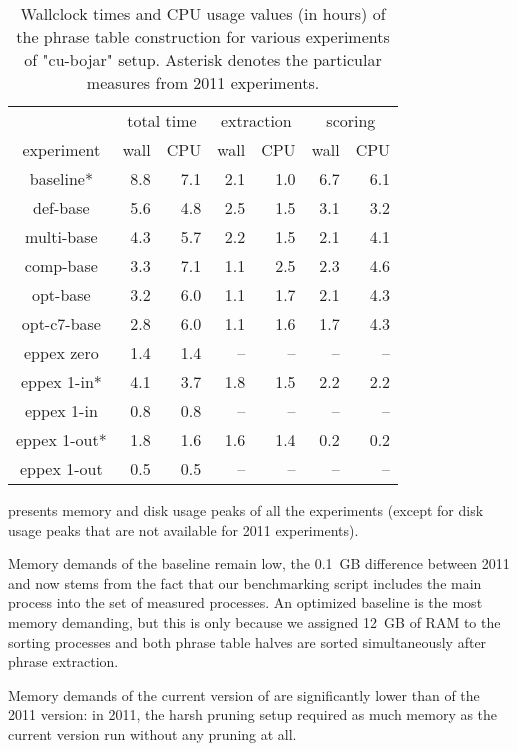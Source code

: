 \begin{table}[ht]
\centering
\begin{tabular}{ | c | r r | r r | r r | }
\hline
 & \multicolumn{2}{|c|}{total time} & \multicolumn{2}{|c|}{extraction} & \multicolumn{2}{|c|}{scoring} \\
experiment & wall & CPU & wall & CPU & wall & CPU \\
\hline
\hline
baseline*     & 8.8 & 7.1 & 2.1 & 1.0 & 6.7 & 6.1 \\
def-base      & 5.6 & 4.8 & 2.5 & 1.5 & 3.1 & 3.2 \\
multi-base    & 4.3 & 5.7 & 2.2 & 1.5 & 2.1 & 4.1 \\
comp-base     & 3.3 & 7.1 & 1.1 & 2.5 & 2.3 & 4.6 \\
opt-base      & 3.2 & 6.0 & 1.1 & 1.7 & 2.1 & 4.3 \\
opt-c7-base   & 2.8 & 6.0 & 1.1 & 1.6 & 1.7 & 4.3 \\
eppex zero    & 1.4 & 1.4 & -- & -- & -- & -- \\
\hline
eppex 1-in*   & 4.1 & 3.7 & 1.8 & 1.5 & 2.2 & 2.2 \\
eppex 1-in    & 0.8 & 0.8 & -- & -- & -- & -- \\
\hline
eppex 1-out*  & 1.8 & 1.6 & 1.6 & 1.4 & 0.2 & 0.2 \\
eppex 1-out   & 0.5 & 0.5 & -- & -- & -- & -- \\
\hline
\end{tabular}
\caption{\label{cu-bojar-time-benchmarks}
Wallclock times and CPU usage values (in hours) of the phrase table
construction for various experiments of "cu-bojar" setup.
Asterisk denotes the particular measures from 2011 experiments.}
\end{table}

 presents memory and disk usage peaks of all the experiments
(except for disk usage peaks that are not available for 2011 experiments).

Memory demands of the baseline remain low, the 0.1~GB difference between 2011 and now
stems from the fact that our benchmarking script includes the main process into the set of
measured processes.
An optimized baseline is the most memory demanding, but this is only because we assigned 12~GB
of RAM to the sorting processes and both phrase table halves are sorted simultaneously after
phrase extraction.

Memory demands of the current version of \eppex{} are significantly lower than of the 2011 version:
in 2011, the harsh pruning setup required as much memory as the current version run without
any pruning at all.

